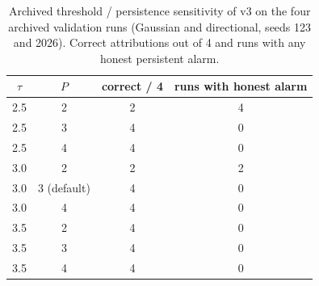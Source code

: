 \begin{table}[t]
\centering\footnotesize
\setlength{\tabcolsep}{4pt}
\caption{Archived threshold / persistence sensitivity of v3 on the four archived validation runs (Gaussian and directional, seeds 123 and 2026). Correct attributions out of 4 and runs with any honest persistent alarm.}
\label{tab:sensitivity}
\begin{tabular}{@{}cccc@{}}
\toprule
$\tau$ & $P$ & correct / 4 & runs with honest alarm \\
\midrule
2.5 & 2 & 2 & 4 \\
2.5 & 3 & 4 & 0 \\
2.5 & 4 & 4 & 0 \\
3.0 & 2 & 2 & 2 \\
3.0 & 3 (default) & 4 & 0 \\
3.0 & 4 & 4 & 0 \\
3.5 & 2 & 4 & 0 \\
3.5 & 3 & 4 & 0 \\
3.5 & 4 & 4 & 0 \\
\bottomrule
\end{tabular}
\end{table}
